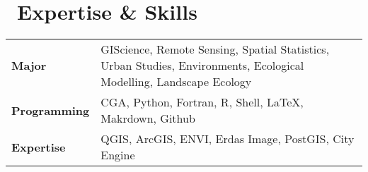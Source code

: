 \section{\texorpdfstring{\faLaptop\ Expertise \& Skills}{Expertise \& Skills}}
\begin{tabular}{p{} p{}}
\textbf{Major} & GIScience, Remote Sensing, Spatial Statistics, Urban Studies, Environments, Ecological Modelling, Landscape Ecology\\
\textbf{Programming} & CGA, Python, Fortran, R, Shell, LaTeX, Makrdown, Github \\
\textbf{Expertise} & QGIS, ArcGIS, ENVI, Erdas Image, PostGIS, City Engine \\
\end{tabular}
